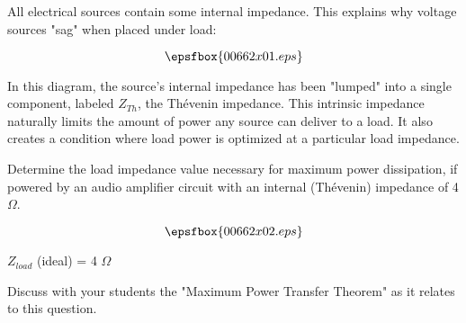 

All electrical sources contain some internal impedance.  This explains why voltage sources "sag" when placed under load:

$$\epsfbox{00662x01.eps}$$

In this diagram, the source's internal impedance has been "lumped" into a single component, labeled $Z_{Th}$, the Th\'evenin impedance.  This intrinsic impedance naturally limits the amount of power any source can deliver to a load.  It also creates a condition where load power is optimized at a particular load impedance.

Determine the load impedance value necessary for maximum power dissipation, if powered by an audio amplifier circuit with an internal (Th\'evenin) impedance of 4 $\Omega$.

$$\epsfbox{00662x02.eps}$$







$Z_{load}$ (ideal) = 4 $\Omega$







Discuss with your students the "Maximum Power Transfer Theorem" as it relates to this question.




